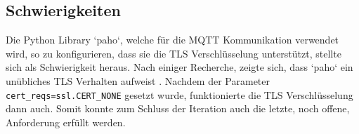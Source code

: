 \subsection{Schwierigkeiten}
Die Python Library `paho`, welche für die \ac{MQTT} Kommunikation verwendet wird, so zu konfigurieren,
dass sie die \ac{TLS} Verschlüsselung unterstützt, stellte sich als Schwierigkeit heraus.
Nach einiger Recherche, zeigte sich, dass `paho` ein unübliches \ac{TLS}
Verhalten aufweist \parencite{eclipse_paho_ssl_2019}.
Nachdem der Parameter \texttt{cert\_reqs=ssl.CERT\_NONE} gesetzt wurde, funktionierte
die \ac{TLS} Verschlüsselung dann auch.
Somit konnte zum Schluss der Iteration auch die letzte, noch offene, Anforderung erfüllt werden.